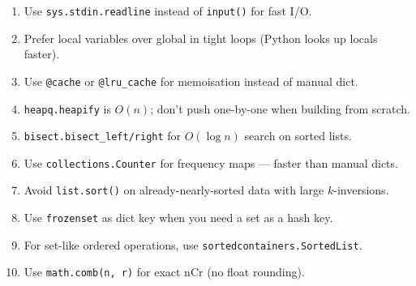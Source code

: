 \documentclass[11pt,a4paper]{report}
\begin{document}
\begin{tipbox}
\begin{enumerate}[leftmargin=*]
\item Use \texttt{sys.stdin.readline} instead of \texttt{input()} for fast I/O.
\item Prefer local variables over global in tight loops (Python looks up locals faster).
\item Use \texttt{@cache} or \texttt{@lru\_cache} for memoisation instead of manual dict.
\item \texttt{heapq.heapify} is $O(n)$; don't push one-by-one when building from scratch.
\item \texttt{bisect.bisect\_left/right} for $O(\log n)$ search on sorted lists.
\item Use \texttt{collections.Counter} for frequency maps --- faster than manual dicts.
\item Avoid \texttt{list.sort()} on already-nearly-sorted data with large $k$-inversions.
\item Use \texttt{frozenset} as dict key when you need a set as a hash key.
\item For set-like ordered operations, use \texttt{sortedcontainers.SortedList}.
\item Use \texttt{math.comb(n, r)} for exact nCr (no float rounding).
\end{enumerate}
\end{tipbox}
\end{document}
